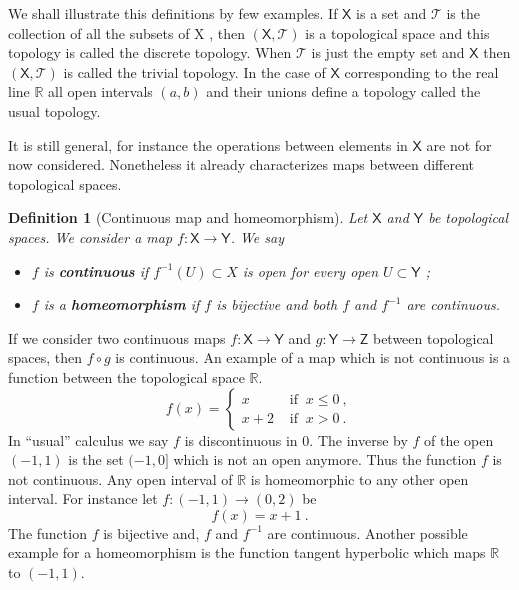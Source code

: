 \documentclass[10pt]{book}
\newcommand{\Tcal}{\mathcal{T}}
\newcommand{\Rbb}{\mathbb{R}}
\newcommand{\Xsf}{\mathsf{X}}
\newcommand{\Ysf}{\mathsf{Y}}
\newcommand{\Zsf}{\mathsf{Z}}
\theoremstyle{break}
\newtheorem{definition}{Definition}
\begin{document}
\bigskip


We shall illustrate this definitions by few examples. If $\Xsf$ is a set and $\Tcal$ is the collection of all the subsets of X , then $(\Xsf,\Tcal)$ is a topological space and this topology is called the discrete topology. When $\Tcal$ is just the empty set and $\Xsf$ then $(\Xsf,\Tcal)$ is called the trivial topology. In the case of $\Xsf$ corresponding to the real line $\Rbb$ all open intervals $(a,b)$ and their unions define a topology called the usual topology. 


\bigskip


It is still general, for instance the operations between elements in $\Xsf$ are not for now considered. Nonetheless it already characterizes maps between different topological spaces.


\begin{definition}[Continuous map and homeomorphism]
%
Let $\Xsf$ and $\Ysf$ be topological spaces. We consider a map $f : \Xsf \to \Ysf$. We say
%
\begin{itemize}
\item $f$ is \textbf{continuous} if $f^{-1}(U) \subset X$ is open for every open $U \subset\Ysf$ ;
\item $f$ is a \textbf{homeomorphism} if $f$ is bijective and both $f$ and $f^{-1}$ are continuous.
\end{itemize}
%
\end{definition}


If we consider two continuous maps $f : \Xsf \to \Ysf$ and $g : \Ysf \to \Zsf$ between topological spaces, then $f \circ g$ is continuous. An example of a map which is not continuous is a function between the topological space $\Rbb$.
%
\begin{equation*}
f(x) = \left\{
\begin{array}{ll}
x & \mbox{ if } \ x \leq 0 \ , \\
x + 2 & \mbox{ if } \ x > 0 \ .
\end{array}
\right.
\end{equation*}
%
In ``usual'' calculus we say $f$ is discontinuous in $0$. The inverse by $f$ of the open $(-1,1)$ is the set $(-1,0]$ which is not an open anymore. Thus the function $f$ is not continuous. Any open interval of $\Rbb$ is homeomorphic to any other open interval. For instance let $f: (-1,1) \to (0,2)$ be
%
\begin{equation*}
f(x) = x + 1 \ . 
\end{equation*}
%
The function $f$ is bijective and, $f$ and $f^{-1}$ are continuous. Another possible example for a homeomorphism is the function tangent hyperbolic which maps $\Rbb$ to $(-1,1)$.
\end{document}
